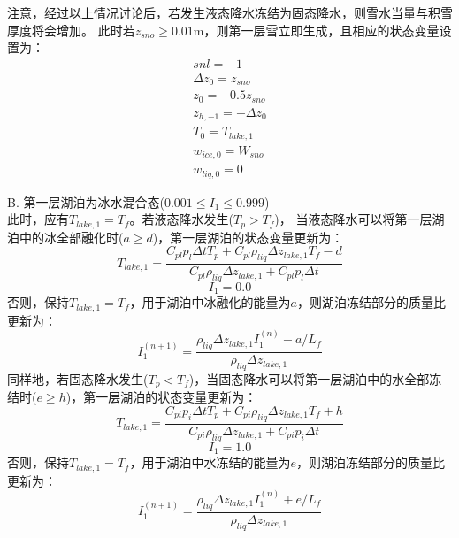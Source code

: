注意，经过以上情况讨论后，若发生液态降水冻结为固态降水，则雪水当量与积雪厚度将会增加。
此时若$z_{sno}\geq0.01$m，则第一层雪立即生成，且相应的状态变量设置为：
\begin{equation}
\begin{array}{c}
    snl=-1 \\ 
    \Delta z_{0}=z_{sno} \\ 
    z_{0}=-0.5 z_{sno} \\
    z_{h,-1}=-\Delta z_{0} \\ 
    T_{0}=T_{lake, 1} \\
    w_{ice, 0}=W_{sno} \\
    w_{liq, 0}=0
\end{array}
\end{equation}

B. 第一层湖泊为冰水混合态($0.001\le I_1\le0.999$)\\
此时，应有$T_{lake,1}=T_f$。若液态降水发生($T_p>T_f$)，
当液态降水可以将第一层湖泊中的冰全部融化时($a\geq d$)，第一层湖泊的状态变量更新为：
\begin{equation}
T_{lake, 1}=\frac{C_{pl} p_{l} \Delta t T_{p}+C_{pl} \rho_{liq} \Delta z_{lake, 1} T_{f}-d}{C_{pl} \rho_{liq} \Delta z_{lake, 1}+C_{pl} p_{l} \Delta t}
\end{equation}
\begin{equation}
I_{1}=0.0
\end{equation}
否则，保持$T_{lake,1}=T_f$，用于湖泊中冰融化的能量为$a$，则湖泊冻结部分的质量比更新为：
\begin{equation}
I_{1}^{(n+1)}=\frac{\rho_{liq} \Delta z_{lake, 1} I_{1}^{(n)}-a / L_{f}}{\rho_{liq} \Delta z_{lake, 1}}
\end{equation}
同样地，若固态降水发生($T_p<T_f$)，当固态降水可以将第一层湖泊中的水全部冻结时($e\geq h$)，第一层湖泊的状态变量更新为：
\begin{equation}
T_{lake, 1}=\frac{C_{p i} p_{i} \Delta t T_{p}+C_{p i} \rho_{liq} \Delta z_{lake, 1} T_{f}+h}{C_{p i} \rho_{liq} \Delta z_{lake, 1}+C_{p i} p_{i} \Delta t}
\end{equation}
\begin{equation}
I_{1}=1.0
\end{equation}
否则，保持$T_{lake,1}=T_f$，用于湖泊中水冻结的能量为$e$，则湖泊冻结部分的质量比更新为：
\begin{equation}
I_{1}^{(n+1)}=\frac{\rho_{liq} \Delta z_{lake, 1} I_{1}^{(n)}+e / L_{f}}{\rho_{liq} \Delta z_{lake, 1}}
\end{equation}

